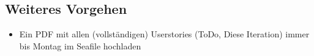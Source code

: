 \documentclass[colorback, accentcolor=tud1c, paper=a4]{tudexercise}
\begin{document}
\begin{multicols}{2}
\subsection*{Weiteres Vorgehen}
\begin{itemize}
\item Ein PDF mit allen (vollständigen) Userstories (ToDo, Diese Iteration) immer bis Montag
  im Seafile hochladen
\end{itemize}
\end{multicols}
	
\end{document}
